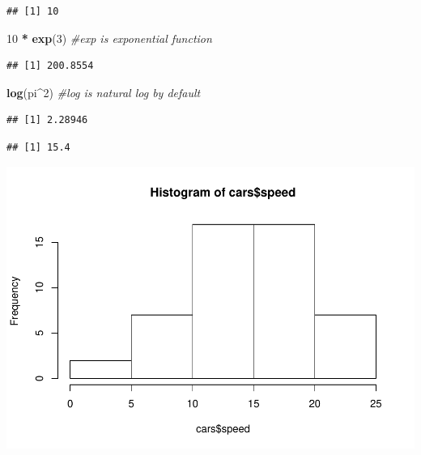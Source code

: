 \documentclass[
]{book}
\newenvironment{Shaded}{\begin{snugshade}}{\end{snugshade}}
\newcommand{\CommentTok}[1]{\textcolor[rgb]{0.56,0.35,0.01}{\textit{#1}}}
\newcommand{\DecValTok}[1]{\textcolor[rgb]{0.00,0.00,0.81}{#1}}
\newcommand{\KeywordTok}[1]{\textcolor[rgb]{0.13,0.29,0.53}{\textbf{#1}}}
\newcommand{\NormalTok}[1]{#1}
\newcommand{\OperatorTok}[1]{\textcolor[rgb]{0.81,0.36,0.00}{\textbf{#1}}}
\newcommand{\StringTok}[1]{\textcolor[rgb]{0.31,0.60,0.02}{#1}}
\theoremstyle{definition}
\theoremstyle{definition}
\theoremstyle{definition}
\theoremstyle{remark}
\begin{document}
\begin{verbatim}
## [1] 10
\end{verbatim}

\begin{Shaded}
\begin{Highlighting}[]
\DecValTok{10} \OperatorTok{*}\StringTok{ }\KeywordTok{exp}\NormalTok{(}\DecValTok{3}\NormalTok{) }\CommentTok{#exp is exponential function}
\end{Highlighting}
\end{Shaded}

\begin{verbatim}
## [1] 200.8554
\end{verbatim}

\begin{Shaded}
\begin{Highlighting}[]
\KeywordTok{log}\NormalTok{(pi}\OperatorTok{^}\DecValTok{2}\NormalTok{) }\CommentTok{#log is natural log by default}
\end{Highlighting}
\end{Shaded}

\begin{verbatim}
## [1] 2.28946
\end{verbatim}

\begin{Shaded}
\end{Shaded}

\begin{verbatim}
## [1] 15.4
\end{verbatim}

\begin{Shaded}
\end{Shaded}

\includegraphics{StatisticalMethods_files/figure-latex/unnamed-chunk-190-1.pdf}
\end{document}
